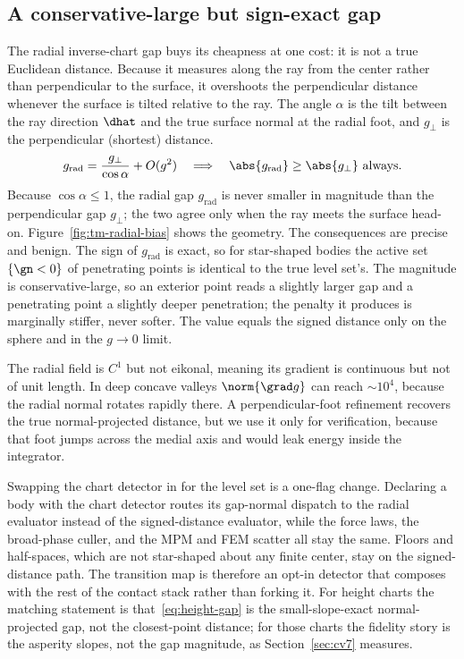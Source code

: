 \subsection{A conservative-large but sign-exact gap}\label{sec:tmap:bias}

The radial inverse-chart gap buys its cheapness at one cost: it is not a true Euclidean distance. Because
it measures along the ray from the center rather than perpendicular to the surface, it overshoots the
perpendicular distance whenever the surface is tilted relative to the ray. The angle $\alpha$ is the tilt
between the ray direction $\dhat$ and the true surface normal at the radial foot, and $g_\perp$ is the
perpendicular (shortest) distance.
%
\begin{equation}\label{eq:radial-bias}
g_{\mathrm{rad}}=\frac{g_\perp}{\cos\alpha}+O(g^2)
\quad\Longrightarrow\quad
\abs{g_{\mathrm{rad}}}\ge\abs{g_\perp}\ \text{always}.
\end{equation}
%
Because $\cos\alpha\le1$, the radial gap $g_{\mathrm{rad}}$ is never smaller in magnitude than the
perpendicular gap $g_\perp$; the two agree only when the ray meets the surface head-on.
Figure~\ref{fig:tm-radial-bias} shows the geometry. The consequences are precise and benign. The sign of
$g_{\mathrm{rad}}$ is exact, so for star-shaped bodies the active set $\{\gn<0\}$ of penetrating points is
identical to the true level set's. The magnitude is conservative-large, so an exterior point reads a
slightly larger gap and a penetrating point a slightly deeper penetration; the penalty it produces is
marginally stiffer, never softer. The value equals the signed distance only on the sphere and in the
$g\to0$ limit.

The radial field is $C^1$ but not eikonal, meaning its gradient is continuous but not of unit length. In
deep concave valleys $\norm{\grad g}$ can reach $\sim10^4$, because the radial normal rotates rapidly there.
A perpendicular-foot refinement recovers the true normal-projected distance, but we use it only for
verification, because that foot jumps across the medial axis and would leak energy inside the integrator.

Swapping the chart detector in for the level set is a one-flag change. Declaring a body with the chart
detector routes its gap-normal dispatch to the radial evaluator instead of the signed-distance evaluator,
while the force laws, the broad-phase culler, and the MPM and FEM scatter all stay the same. Floors and
half-spaces, which are not star-shaped about any finite center, stay on the signed-distance path. The
transition map is therefore an opt-in detector that composes with the rest of the contact stack rather than
forking it. For height charts the matching statement is that~\eqref{eq:height-gap} is the small-slope-exact
normal-projected gap, not the closest-point distance; for those charts the fidelity story is the asperity
slopes, not the gap magnitude, as Section~\ref{sec:cv7} measures.

